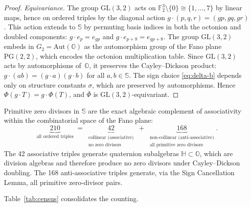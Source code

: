 \begin{proof}
\smallskip
\emph{Equivariance.}\;  The group $\mathrm{GL}(3,2)$ acts on
$\mathbb{F}_2^3\setminus\{0\} \cong \{1,\dots,7\}$ by linear maps,
hence on ordered triples by the diagonal action $g\cdot(p,q,r) =
(gp,gq,gr)$.  This action extends to $\mathbb{S}$ by permuting basis
indices in both the octonion and doubled components: $g\cdot e_p = e_{gp}$
and $g\cdot e_{p+8} = e_{gp+8}$.  The group $\mathrm{GL}(3,2)$ embeds in
$G_2 = \mathrm{Aut}(\mathbb{O})$ as the automorphism group of the Fano
plane $\mathrm{PG}(2,2)$, which encodes the octonion multiplication
table.  Since $\mathrm{GL}(3,2)$ acts by automorphisms of~$\mathbb{O}$,
it preserves the Cayley--Dickson product: $g\cdot(ab) = (g\cdot a)(g\cdot
b)$ for all $a,b\in\mathbb{S}$.  The sign choice \eqref{eq:delta-b}
depends only on structure constants $\sigma$, which are preserved by
automorphisms.  Hence
$\Phi(g\cdot T) = g\cdot\Phi(T)$, and $\bar\Phi$ is
$\mathrm{GL}(3,2)$-equivariant.
\end{proof}


\begin{corollary}\label{cor:complement}
Primitive zero divisors in $\mathbb{S}$ are the exact algebraic complement
of associativity within the combinatorial space of the Fano plane:
\begin{equation}\label{eq:complement}
  \underbrace{210}_{\text{all ordered triples}}
  \;=\;
  \underbrace{42}_{\substack{\text{collinear (associative)}\\
                              \text{no zero divisors}}}
  \;+\;
  \underbrace{168}_{\substack{\text{non-collinear (anti-associative)}\\
                              \text{all primitive zero divisors}}}.
\end{equation}
The 42 associative triples generate quaternion subalgebras
$\mathbb{H}\subset\mathbb{O}$, which are division algebras and therefore
produce no zero divisors under Cayley--Dickson doubling.  The 168
anti-associative triples generate, via the Sign Cancellation Lemma, all
primitive zero-divisor pairs.
\end{corollary}

\medskip
\noindent
Table~\ref{tab:census} consolidates the counting.

